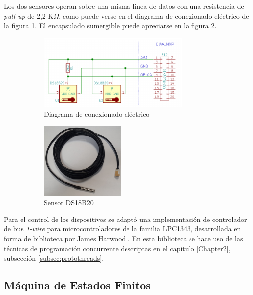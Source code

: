 Los dos sensores operan sobre una misma línea de datos con una resistencia de \textit{pull-up} de 2,2 K$\Omega$, como puede verse en el diagrama de conexionado eléctrico de la figura \ref{fig:ds18b20_conexionado}.  El encapsulado sumergible puede apreciarse en la figura \ref{fig:termometro}.


\begin{figure}[htpb]
	\centering
	\begin{subfigure}{.6\textwidth}
		\centering
		\includegraphics[height=3.7cm]{./Figures/ds18b20_conexionado.pdf}
		\caption{ Diagrama de conexionado eléctrico}
  		\label{fig:ds18b20_conexionado}
	\end{subfigure}%
	\begin{subfigure}{.4\textwidth}
		\centering
		\includegraphics[height=3.7cm]{./Figures/ds18b20.jpg}
		\caption{ Sensor DS18B20}
		\label{fig:termometro}
	\end{subfigure}
	\caption{}
	\label{fig:ds18b20}
\end{figure}


Para el control de los dispositivos se adaptó una implementación de controlador de bus \textit{1-wire} para microcontroladores de la familia LPC1343, desarrollada en forma de biblioteca por James Harwood \citep{harwood}.  En esta biblioteca se hace uso de las técnicas de programación concurrente descriptas en el capitulo \ref{Chapter2}, subsección \ref{subsec:protothreads}.

\subsection{Máquina de Estados Finitos}

